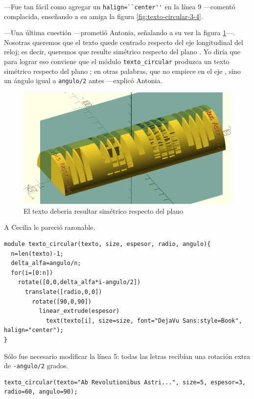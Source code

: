 ---Fue tan fácil como agregar un \lstinline!halign=``center''! en la
línea 9 ---comentó complacida, enseñando a su amiga la figura
\ref{fig:texto-circular-3-4}.

---Una última cuestión ---prometió Antonia, señalando a su vez la
figura \ref{fig:texto-plano-yz}---.  Nosotras queremos que el texto
quede centrado respecto del eje longitudinal del reloj; es decir,
queremos que resulte simétrico respecto del plano .  Yo
diría que para lograr eso conviene que el módulo
\texttt{texto\_cir\-cular} produzca un texto simétrico respecto del
plano ; en otras palabras, que no empiece en el eje
, sino un ángulo igual a \lstinline!angulo/2! antes
---explicó Antonia.



\begin{figure}[ht]
  \centering
  \includegraphics[width=.9\textwidth]{imagenes/texto-plano-yz}  
  \caption{El texto deberia resultar simétrico respecto del plano
    }
  \label{fig:texto-plano-yz}
\end{figure}

A Cecilia le pareció razonable.

\begin{lstlisting}
module texto_circular(texto, size, espesor, radio, angulo){
  n=len(texto)-1;
  delta_alfa=angulo/n;
  for(i=[0:n])
    rotate([0,0,delta_alfa*i-angulo/2])    
      translate([radio,0,0])
        rotate([90,0,90])
          linear_extrude(espesor)
            text(texto[i], size=size, font="DejaVu Sans:style=Book", halign="center");
}
\end{lstlisting}

Sólo fue necesario modificar la línea 5: todas las letras recibían una
rotación extra de \lstinline!-angulo/2! grados.

\begin{lstlisting}[numbers=none]
texto_circular(texto="Ab Revolutionibus Astri...", size=5, espesor=3, radio=60, angulo=90);
\end{lstlisting}


